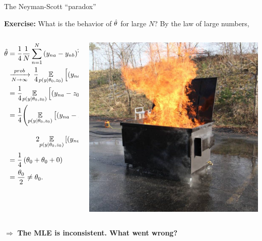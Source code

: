\begin{frame}{The Neyman-Scott ``paradox''}

\textbf{Exercise:}
What is the behavior of $\hat\theta$ for large $N$?
By the law of large numbers,
%
\begin{columns}
%
\begin{column}{0.7\textwidth}
\begin{align*}
%
\thetahat &={} \frac{1}{4} \meann \left( y_{na}  - y_{nb}\right)^2\\
&\plim{} \frac{1}{4}
\expect{p(y | \theta_0, z_0)}{\left( y_{na}  - y_{nb}\right)^2}
\\&=
\frac{1}{4}
\expect{p(y | \theta_0, z_0)}{\left( y_{na} - z_{0n} - (y_{nb} - z_{0n})\right)^2}
\\&=
\frac{1}{4}\Bigg(
    \expect{p(y | \theta_0, z_0)}{( y_{na} - z_{0n})^2} +
    \expect{p(y | \theta_0, z_0)}{( y_{nb} - z_{0n})^2} +
    \\&\quad\quad\quad\quad
    2 \expect{p(y | \theta_0, z_0)}{( y_{na} - z_{0n})( y_{nb} - z_{0n})}
\Bigg)
\\&=
\frac{1}{4}\left(\theta_0 + \theta_0 + 0\right)
\\&= \frac{\theta_0}{2} \ne \theta_0.
%
\end{align*}
%
\end{column}
\begin{column}{0.3\textwidth}
    \pause
    \includegraphics[width=1.0\textwidth]{static_images/dumpster.jpg}
\end{column}
\end{columns}

\pause
\vspace{2em}
$\Rightarrow$ \textbf{The MLE is inconsistent.  What went wrong?}

\end{frame}


